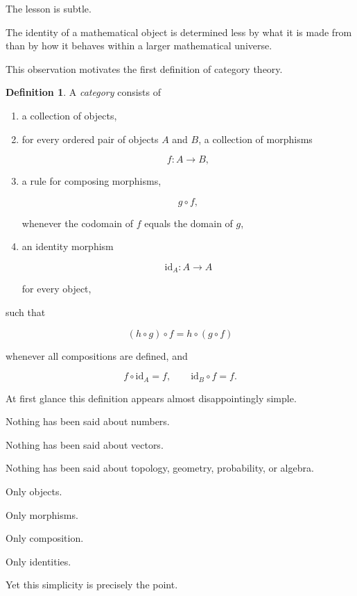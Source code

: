 \documentclass[11pt]{book}
\numberwithin{equation}{chapter}
\theoremstyle{definition}
\newtheorem{definition}{Definition}[chapter]
\theoremstyle{plain}
\theoremstyle{remark}
\begin{document}
The lesson is subtle.

The identity of a mathematical object is determined less by what it is made from than by how it behaves within a larger mathematical universe.

This observation motivates the first definition of category theory.

\begin{definition}
A \emph{category} consists of

\begin{enumerate}
\item a collection of objects,

\item for every ordered pair of objects \(A\) and \(B\), a collection of morphisms

\[
f:A\rightarrow B,
\]

\item a rule for composing morphisms,

\[
g\circ f,
\]

whenever the codomain of \(f\) equals the domain of \(g\),

\item an identity morphism

\[
\mathrm{id}_A:A\rightarrow A
\]

for every object,

\end{enumerate}

such that

\[
(h\circ g)\circ f
=
h\circ(g\circ f)
\]

whenever all compositions are defined, and

\[
f\circ\mathrm{id}_A=f,
\qquad
\mathrm{id}_B\circ f=f.
\]

\end{definition}

At first glance this definition appears almost disappointingly simple.

Nothing has been said about numbers.

Nothing has been said about vectors.

Nothing has been said about topology, geometry, probability, or algebra.

Only objects.

Only morphisms.

Only composition.

Only identities.

Yet this simplicity is precisely the point.
\end{document}
